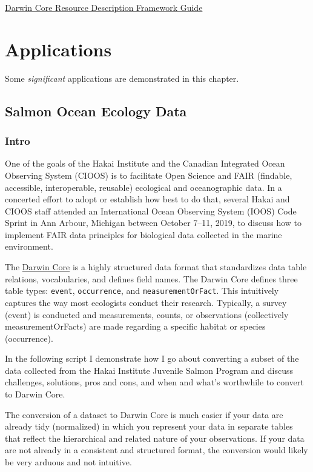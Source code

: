 \documentclass[
]{book}
\begin{document}
\href{https://dwc.tdwg.org/rdf/}{Darwin Core Resource Description Framework Guide}

\hypertarget{applications}{%
\chapter{Applications}\label{applications}}

Some \emph{significant} applications are demonstrated in this chapter.

\hypertarget{salmon-ocean-ecology-data}{%
\section{Salmon Ocean Ecology Data}\label{salmon-ocean-ecology-data}}

\hypertarget{intro-1}{%
\subsection{Intro}\label{intro-1}}

One of the goals of the Hakai Institute and the Canadian Integrated Ocean Observing System (CIOOS) is to facilitate Open Science and FAIR (findable, accessible, interoperable, reusable) ecological and oceanographic data. In a concerted effort to adopt or establish how best to do that, several Hakai and CIOOS staff attended an International Ocean Observing System (IOOS) Code Sprint in Ann Arbour, Michigan between October 7--11, 2019, to discuss how to implement FAIR data principles for biological data collected in the marine environment.

The \href{https://dwc.tdwg.org}{Darwin Core} is a highly structured data format that standardizes data table relations, vocabularies, and defines field names. The Darwin Core defines three table types: \texttt{event}, \texttt{occurrence}, and \texttt{measurementOrFact}. This intuitively captures the way most ecologists conduct their research. Typically, a survey (event) is conducted and measurements, counts, or observations (collectively measurementOrFacts) are made regarding a specific habitat or species (occurrence).

In the following script I demonstrate how I go about converting a subset of the data collected from the Hakai Institute Juvenile Salmon Program and discuss challenges, solutions, pros and cons, and when and what's worthwhile to convert to Darwin Core.

The conversion of a dataset to Darwin Core is much easier if your data are already tidy (normalized) in which you represent your data in separate tables that reflect the hierarchical and related nature of your observations. If your data are not already in a consistent and structured format, the conversion would likely be very arduous and not intuitive.
\end{document}
